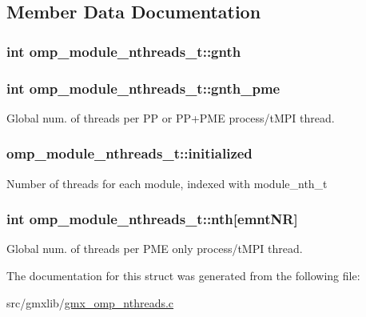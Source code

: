 \subsection{\-Member \-Data \-Documentation}
\hypertarget{structomp__module__nthreads__t_a74584a24b817803878e0e046ff1fb327}{
\subsubsection[{gnth}]{\setlength{\rightskip}{0pt plus 5cm}int {\bf omp\-\_\-module\-\_\-nthreads\-\_\-t\-::gnth}}}\label{structomp__module__nthreads__t_a74584a24b817803878e0e046ff1fb327}
\hypertarget{structomp__module__nthreads__t_a84a7847560c9b6b7d7ce57935e587f1e}{
\subsubsection[{gnth\-\_\-pme}]{\setlength{\rightskip}{0pt plus 5cm}int {\bf omp\-\_\-module\-\_\-nthreads\-\_\-t\-::gnth\-\_\-pme}}}\label{structomp__module__nthreads__t_a84a7847560c9b6b7d7ce57935e587f1e}
\-Global num. of threads per \-P\-P or \-P\-P+\-P\-M\-E process/t\-M\-P\-I thread. \hypertarget{structomp__module__nthreads__t_ab6b5039c1fc33a807163a1c345ada755}{
\subsubsection[{initialized}]{ {\bf omp\-\_\-module\-\_\-nthreads\-\_\-t\-::initialized}}}\label{structomp__module__nthreads__t_ab6b5039c1fc33a807163a1c345ada755}
\-Number of threads for each module, indexed with module\-\_\-nth\-\_\-t \hypertarget{structomp__module__nthreads__t_aac0022d490268302b55434c9ea349020}{
\subsubsection[{nth}]{\setlength{\rightskip}{0pt plus 5cm}int {\bf omp\-\_\-module\-\_\-nthreads\-\_\-t\-::nth}\mbox{[}{\bf emnt\-N\-R}\mbox{]}}}\label{structomp__module__nthreads__t_aac0022d490268302b55434c9ea349020}
\-Global num. of threads per \-P\-M\-E only process/t\-M\-P\-I thread. 

\-The documentation for this struct was generated from the following file\-:\begin{DoxyCompactItemize}
\item 
src/gmxlib/\hyperlink{gmx__omp__nthreads_8c}{gmx\-\_\-omp\-\_\-nthreads.\-c}\end{DoxyCompactItemize}
